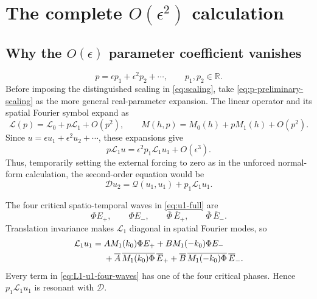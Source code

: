 \documentclass[11pt]{article}
\newcommand{\cQ}{\mathcal{Q}}
\newcommand{\cL}{\mathcal{L}}
\newcommand{\cD}{\mathcal{D}}
\begin{document}
\section{The complete \texorpdfstring{$O(\epsilon^2)$}{O(epsilon squared)} calculation}
\label{sec:u2}

\subsection{Why the \texorpdfstring{$O(\epsilon)$}{O(epsilon)} parameter
coefficient vanishes}

\begin{equation}
  p=\epsilon p_1+\epsilon^2p_2+\cdots,
  \qquad p_1,p_2\in\mathbb{R}.
  \label{eq:p-preliminary-scaling}
\end{equation}
Before imposing the distinguished scaling in \eqref{eq:scaling}, take
\eqref{eq:p-preliminary-scaling} as the more general real-parameter
expansion.  The linear operator and its spatial Fourier symbol expand as
\begin{equation}
  \cL(p)=\cL_0+p\cL_1+O(p^2),
  \qquad
  M(h,p)=M_0(h)+pM_1(h)+O(p^2).
  \label{eq:L-preliminary-expansion}
\end{equation}
Since $u=\epsilon u_1+\epsilon^2u_2+\cdots$, these expansions give
\begin{equation}
  p\cL_1u=\epsilon^2p_1\cL_1u_1+O(\epsilon^3).
\end{equation}
Thus, temporarily setting the external forcing to zero as in the unforced
normal-form calculation, the second-order equation would be
\begin{equation}
  \cD u_2=\cQ(u_1,u_1)+p_1\cL_1u_1.
  \label{eq:o2-preliminary}
\end{equation}

The four critical spatio-temporal waves in \eqref{eq:u1-full} are
\begin{equation}
  \Phi E_+,\qquad \Phi E_-,\qquad
  \overline\Phi\,\overline E_+,\qquad
  \overline\Phi\,\overline E_-.
\end{equation}
Translation invariance makes $\cL_1$ diagonal in spatial Fourier modes, so
\begin{align}
  \cL_1u_1={}&A M_1(k_0)\Phi E_+
  +B M_1(-k_0)\Phi E_- \notag\\
  &+\overline A\,\overline{M_1(k_0)\Phi}\,\overline E_+
  +\overline B\,\overline{M_1(-k_0)\Phi}\,\overline E_-.
  \label{eq:L1-u1-four-waves}
\end{align}
Every term in \eqref{eq:L1-u1-four-waves} has one of the four critical
phases.  Hence $p_1\cL_1u_1$ is resonant with $\cD$.
\end{document}
